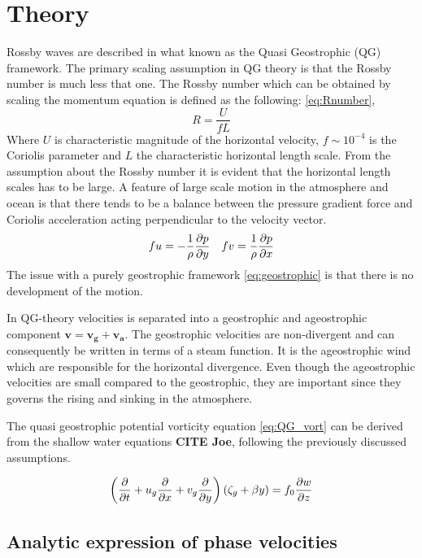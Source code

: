 \section{Theory}

Rossby waves are described in what known as the Quasi Geostrophic (QG)
framework. The primary scaling assumption in QG theory is that the Rossby number
is much less that one. The Rossby number which can be obtained by scaling the
momentum equation is defined as the following:
\cref{eq:Rnumber},  
\begin{equation}\label{eq:Rnumber}
    R = \frac{U}{fL}
\end{equation}
Where $U$ is characteristic magnitude of the horizontal velocity, $f \sim 10^{-4}$
is the Coriolis parameter and $L$ the characteristic horizontal length scale.
From the assumption about the Rossby number it is evident that the horizontal
length scales has to be large. A feature of large scale motion in the atmosphere
and ocean is that there tends to be a balance between the pressure gradient
force and Coriolis acceleration acting perpendicular to the velocity vector. 
\begin{equation}\label{eq:geostrophic}
    fu = -\frac{1}{\rho}\pdv{p}{y} \quad fv = \frac{1}{\rho}\pdv{p}{x}
\end{equation} 
The issue with a purely geostrophic framework \cref{eq:geostrophic} is that
there is no development of the motion. 

In QG-theory velocities is
separated into a geostrophic and ageostrophic component $\mathbf{v} = \mathbf
{v_g} +\mathbf{v_a}$. The geostrophic velocities are
non-divergent and can consequently be written in terms of a steam function.
It is the ageostrophic wind which are responsible for the
horizontal divergence. Even though the ageostrophic velocities
are small compared to the geostrophic, they are important since
they governs the rising and sinking in the atmosphere.

The quasi geostrophic potential vorticity equation \cref{eq:QG_vort} can be
derived from the shallow water equations \textbf{CITE Joe}, following the
previously discussed
assumptions. 

\begin{equation}\label{eq:QG_vort}
    \left(\pdv{}{t}+u_g \pdv{}{x} + v_g \pdv{}{y} \right)(\zeta_g + \beta y) = 
    f_0 \pdv{w}{z}
\end{equation}

\subsection{Analytic expression of phase velocities}

